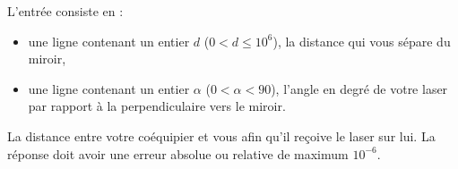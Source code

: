 \begin{figure}[h]
\end{figure}



\begin{Input}
	L'entrée consiste en :
	\begin{itemize}
		\item une ligne contenant un entier $d$ ($0 < d \le 10^6$), la distance qui vous sépare du miroir,
		\item une ligne contenant un entier $\alpha$ ($0 < \alpha < 90$), l'angle en degré de votre laser par rapport à la perpendiculaire vers le miroir.
	\end{itemize}
\end{Input}

\begin{Output}
	La distance entre votre coéquipier et vous afin qu'il reçoive le laser sur lui.
	La réponse doit avoir une erreur absolue ou relative de maximum $10^{-6}$.
\end{Output}
